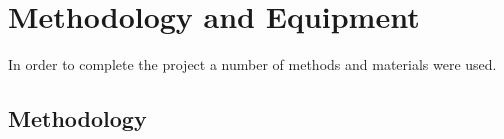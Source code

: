 \chapter{Methodology and Equipment}
\label{chap:methodology}

In order to complete the project a number of methods and materials were used.
\section{Methodology}
\label{sec:methodology}





